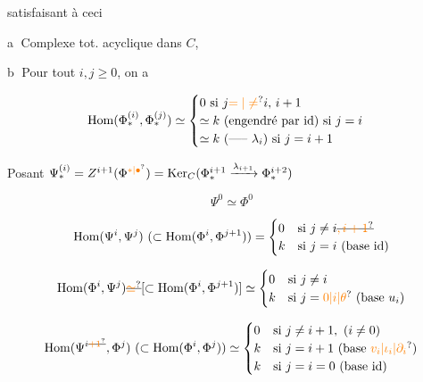 satisfaisant à ceci \par\textcircled{a} Complexe tot. acyclique dans $C$, 

\textcircled{b} Pour tout $i,j\geq0$, on a

\[\operatorname{Hom}(\Phi_{\ast}^{(i)},\Phi_{\ast}^{(j)})\simeq
\begin{cases}0\ \text{si }j\unsure{=|\ne}i,\,i+1\\
\simeq k\ (\text{engendré par id})\ \text{si }j=i\\
\simeq k\ (\text{----- }\lambda_i)\ \text{si }j=i+1\end{cases}\]

Posant $\Psi_{\ast}^{(i)}=Z^{i+1}(\Phi^{\unsure{\ast|\bullet}})=\operatorname{Ker}_{C}(\Phi_{\ast}^{i+1}\xrightarrow{\lambda_{i+1}}\Phi_{\ast}^{i+2})$ 

\[ \Psi^0\simeq\Phi^0 \]


\[\operatorname{Hom}(\Psi^i,\Psi^j)\ (\subset\operatorname{Hom}(\Phi^i,\Phi^{j+1}))=
\begin{cases}0&\text{si }j\ne i\deleted{\unsure{,i+1}}\\k&\text{si }j=i\ (\text{base id})\end{cases}\]

\[\operatorname{Hom}(\Phi^i,\Psi^j)\deleted{\unsure{\simeq}}[\subset\operatorname{Hom}(\Phi^i,\Phi^{j+1})]\simeq
\begin{cases}0&\text{si }j\ne i\\k&\text{si }j=\unsure{0|i|\theta}\ (\text{base }u_i)\end{cases}\]

\[\operatorname{Hom}(\Psi^{i\deleted{\unsure{+1}}},\Phi^j)\ (\subset\operatorname{Hom}(\Phi^i,\Phi^j))\simeq
\begin{cases}0&\text{si }j\ne i+1,\ (i\ne0)\\k&\text{si }j=i+1\ (\text{base }\unsure{v_i|\iota_i|\partial_i})\\ k&\text{si }j=i=0\ (\text{base id})\end{cases}\]

